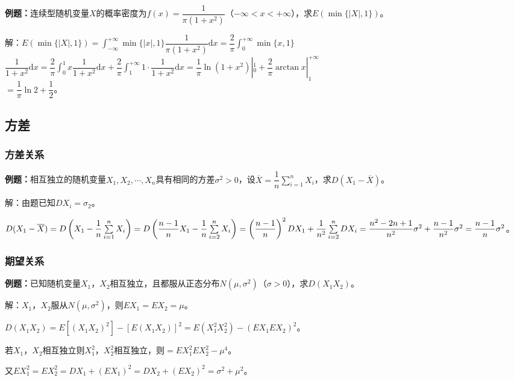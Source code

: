 \documentclass[UTF8, 12pt]{ctexart}
\begin{document}
\textbf{例题：}连续型随机变量$X$的概率密度为$f(x)=\dfrac{1}{\pi(1+x^2)}$（$-\infty<x<+\infty$），求$E(\min\{\vert X\vert,1\})$。

解：$E(\min\{\vert X\vert,1\})=\displaystyle{\int_{-\infty}^{+\infty}}\min\{\vert x\vert,1\}\dfrac{1}{\pi(1+x^2)}\textrm{d}x=\dfrac{2}{\pi}\int_0^{+\infty}\min\{x,1\}$\\$\dfrac{1}{1+x^2}\textrm{d}x=\dfrac{2}{\pi}\displaystyle{\int_0^1}x\dfrac{1}{1+x^2}\textrm{d}x+\dfrac{2}{\pi}\int_1^{+\infty}1\cdot\dfrac{1}{1+x^2}\textrm{d}x=\dfrac{1}{\pi}\ln(1+x^2)|_0^1+\dfrac{2}{\pi}\arctan x|_1^{+\infty}$\\$=\dfrac{1}{\pi}\ln2+\dfrac{1}{2}$。

\subsection{方差}

\subsubsection{方差关系}

\textbf{例题：}相互独立的随机变量$X_1,X_2,\cdots,X_n$具有相同的方差$\sigma^2>0$，设$\overline{X}=\dfrac{1}{n}\sum\limits_{i=1}^nX_i$，求$D(X_1-\overline{X})$。

解：由题已知$DX_i=\sigma_2$。

$D(X_1-\overline{X})=D\left(X_1-\dfrac{1}{n}\sum\limits_{i=1}^nX_i\right)=D\left(\dfrac{n-1}{n}X_1-\dfrac{1}{n}\sum\limits_{i=2}^nX_i\right)=\left(\dfrac{n-1}{n}\right)^2\\DX_1+\dfrac{1}{n^2}\sum\limits_{i=2}^nDX_i=\dfrac{n^2-2n+1}{n^2}\sigma^2+\dfrac{n-1}{n^2}\sigma^2=\dfrac{n-1}{n}\sigma^2$。

\subsubsection{期望关系}

\textbf{例题：}已知随机变量$X_1$，$X_2$相互独立，且都服从正态分布$N(\mu,\sigma^2)$（$\sigma>0$），求$D(X_1X_2)$。

解：$X_1$，$X_2$服从$N(\mu,\sigma^2)$，则$EX_1=EX_2=\mu$。

$D(X_1X_2)=E[(X_1X_2)^2]-[E(X_1X_2)]^2=E(X_1^2X_2^2)-(EX_1EX_2)^2$。

若$X_1$，$X_2$相互独立则$X_1^2$，$X_2^2$相互独立，则$=EX_1^2EX_2^2-\mu^4$。

又$EX_1^2=EX_2^2=DX_1+(EX_1)^2=DX_2+(EX_2)^2=\sigma^2+\mu^2$。
\end{document}
